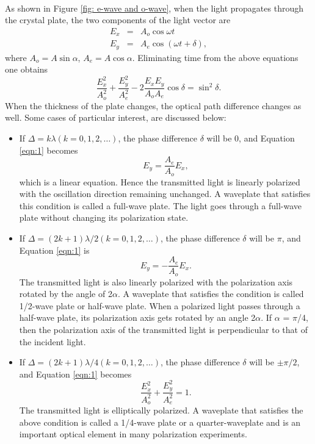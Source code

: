 \documentclass{my_template}
\begin{document}
    \paragraph{}As shown in Figure \ref{fig: e-wave and o-wave}, when the light propagates through the crystal plate, the two components of the light vector are 
    \begin{eqnarray*}
        E_x&=&A_o\cos\omega t\\
        E_y&=&A_e\cos(\omega t+\delta),
    \end{eqnarray*}
    where $A_o=A\sin\alpha$, $A_e=A\cos\alpha$. Eliminating time from the above equations one obtains 
    \begin{equation}
        \frac{E_x^2}{A_o^2}+\frac{E_y^2}{A_e^2}-2\frac{E_xE_y}{A_oA_e}\cos\delta=\sin^2\delta.\label{eqn:1}
    \end{equation}
    When the thickness of the plate changes, the optical path difference changes as well. Some cases of particular interest, are discussed below:
    \begin{itemize}
        \item If $\Delta=k\lambda(k=0,1,2,\dots)$, the phase difference $\delta$ will be 0, and Equation \ref{eqn:1} becomes $$E_y=\frac{A_e}{A_o}E_x,$$which is a linear equation. Hence the transmitted light is linearly polarized with the oscillation direction remaining unchanged. A waveplate that satisfies this condition is called a full-wave plate. The light goes through a full-wave plate without changing its polarization state.
        \item If $\Delta=(2k+1)\lambda/2(k=0,1,2,\dots)$, the phase difference $\delta$ will be $\pi$, and Equation \ref{eqn:1} is $$E_y=-\frac{A_e}{A_o}E_x.$$The transmitted light is also linearly polarized with the polarization axis rotated by the angle of 2$\alpha$. A waveplate that satisfies the condition is called 1/2-wave plate or half-wave plate. When a polarized light passes through a half-wave plate, its polarization axis gets rotated by an angle 2$\alpha$. If $\alpha$ = $\pi$/4, then the polarization axis of the transmitted light is perpendicular to that of the incident light.
        \item If $\Delta=(2k+1)\lambda/4(k=0,1,2,\dots)$, the phase difference $\delta$ will be $\pm\pi/2$, and Equation \ref{eqn:1} becomes $$\frac{E_x^2}{A_o^2}+\frac{E_y^2}{A_e^2}=1.$$The transmitted light is elliptically polarized. A waveplate that satisfies the above condition is called a 1/4-wave plate or a quarter-waveplate and is an important optical element in many polarization experiments.
    \end{itemize}
\end{document}
